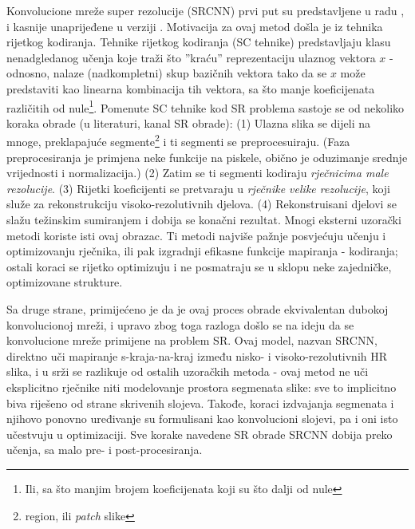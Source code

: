 \documentclass[12pt]{report}
\numberwithin{equation}{section}
\begin{document}

Konvolucione mreže super rezolucije (SRCNN) prvi put su predstavljene u radu \cite{earlier} , i kasnije unaprijeđene u verziji \cite{main}. Motivacija za ovaj metod došla je iz tehnika rijetkog kodiranja. Tehnike rijetkog kodiranja (SC tehnike) \cite{sparse} predstavljaju klasu nenadgledanog učenja koje traži što ''kraću'' reprezentaciju ulaznog vektora $x$ - odnosno, nalaze (nadkompletni) skup bazičnih vektora tako da se $x$ može predstaviti kao linearna kombinacija tih vektora, sa što manje koeficijenata različitih od nule\footnote{Ili, sa što manjim brojem koeficijenata koji su što dalji od nule}. Pomenute SC tehnike kod SR problema \cite{sparse1} sastoje se od nekoliko koraka obrade (u literaturi, kanal SR obrade): (1) Ulazna slika se dijeli na mnoge, preklapajuće segmente\footnote{region, ili \textit{patch} slike} i ti segmenti se preprocesuiraju. (Faza preprocesiranja je primjena neke funkcije na piskele, obično je oduzimanje srednje vrijednosti i normalizacija.) (2) Zatim se ti segmenti kodiraju \textit{rječnicima male rezolucije}. (3) Rijetki koeficijenti se pretvaraju u \textit{rječnike velike rezolucije}, koji služe za rekonstrukciju visoko-rezolutivnih djelova. (4) Rekonstruisani djelovi se slažu težinskim sumiranjem i dobija se konačni rezultat. Mnogi eksterni uzorački metodi koriste isti ovaj obrazac. Ti metodi najviše pažnje posvjećuju učenju i optimizovanju rječnika, ili pak izgradnji efikasne funkcije mapiranja - kodiranja; ostali koraci se rijetko optimizuju i ne posmatraju se u sklopu neke zajedničke, optimizovane strukture.  


Sa druge strane, primijećeno je da je ovaj proces obrade ekvivalentan dubokoj konvolucionoj mreži, i upravo zbog toga razloga došlo se na ideju da se konvolucione mreže primijene na problem SR. Ovaj model, nazvan SRCNN, direktno uči mapiranje s-kraja-na-kraj između nisko- i visoko-rezolutivnih HR slika, i u srži se razlikuje od ostalih uzoračkih metoda - ovaj metod ne uči eksplicitno rječnike niti modelovanje prostora segmenata slike: sve to implicitno biva riješeno od strane skrivenih slojeva. Takođe, koraci izdvajanja segmenata i njihovo ponovno uređivanje su formulisani kao konvolucioni slojevi, pa i oni isto učestvuju u optimizaciji. Sve korake navedene SR obrade SRCNN dobija preko učenja, sa malo pre- i post-procesiranja. 
\end{document}
